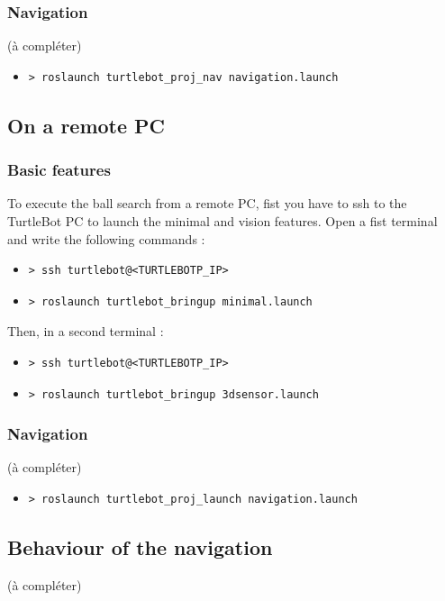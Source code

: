 \documentclass[10pt,a4paper]{article}
\begin{document}
\subsubsection{Navigation}

(à compléter)

\begin{itemize}
\item[]  \begin{verbatim}> roslaunch turtlebot_proj_nav navigation.launch \end{verbatim}
\end{itemize}

\subsection{On a remote PC}

\subsubsection{Basic features}

To execute the ball search from a remote PC, fist you have to ssh to the TurtleBot PC to launch the minimal and vision features. Open a fist terminal and write the following commands :

\begin{itemize}
\item[]  \begin{verbatim}> ssh turtlebot@<TURTLEBOTP_IP> \end{verbatim}
\item[]  \begin{verbatim}> roslaunch turtlebot_bringup minimal.launch \end{verbatim}
\end{itemize}

Then, in a second terminal :

\begin{itemize}
\item[]  \begin{verbatim}> ssh turtlebot@<TURTLEBOTP_IP> \end{verbatim}
\item[]  \begin{verbatim}> roslaunch turtlebot_bringup 3dsensor.launch \end{verbatim}
\end{itemize}

\subsubsection{Navigation}

(à compléter)

\begin{itemize}
\item[]  \begin{verbatim}> roslaunch turtlebot_proj_launch navigation.launch \end{verbatim}
\end{itemize}

\subsection{Behaviour of the navigation}

(à compléter)
\end{document}
